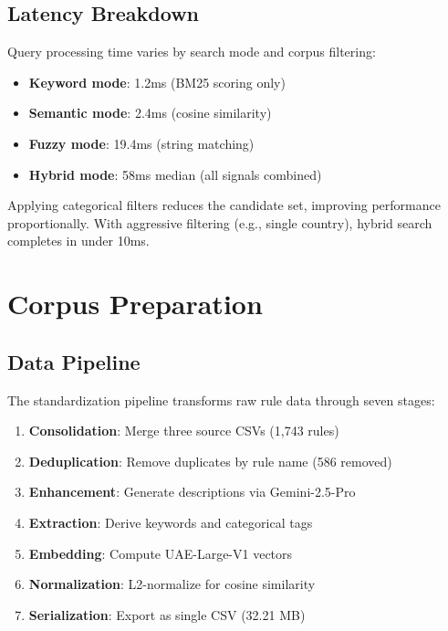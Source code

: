 \subsection{Latency Breakdown}

Query processing time varies by search mode and corpus filtering:

\begin{itemize}[leftmargin=*,itemsep=2pt,topsep=2pt]
  \item \textbf{Keyword mode}: 1.2ms (BM25 scoring only)
  \item \textbf{Semantic mode}: 2.4ms (cosine similarity)
  \item \textbf{Fuzzy mode}: 19.4ms (string matching)
  \item \textbf{Hybrid mode}: 58ms median (all signals combined)
\end{itemize}

Applying categorical filters reduces the candidate set, improving performance proportionally. With aggressive filtering (e.g., single country), hybrid search completes in under 10ms.

\section{Corpus Preparation}
\label{sec:app-pipeline}

\subsection{Data Pipeline}

The standardization pipeline transforms raw rule data through seven stages:

\begin{enumerate}[leftmargin=*,itemsep=2pt,topsep=2pt]
  \item \textbf{Consolidation}: Merge three source CSVs (1,743 rules)
  \item \textbf{Deduplication}: Remove duplicates by rule name (586 removed)
  \item \textbf{Enhancement}: Generate descriptions via Gemini-2.5-Pro
  \item \textbf{Extraction}: Derive keywords and categorical tags
  \item \textbf{Embedding}: Compute UAE-Large-V1 vectors
  \item \textbf{Normalization}: L2-normalize for cosine similarity
  \item \textbf{Serialization}: Export as single CSV (32.21 MB)
\end{enumerate}

